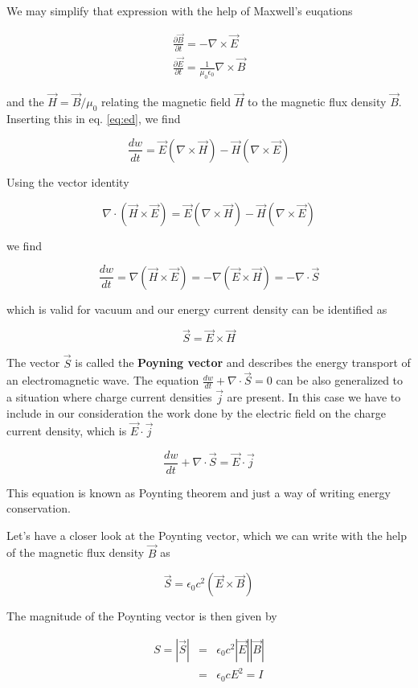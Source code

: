 \documentclass[
  a4paper,
]{book}
\begin{document}
We may simplify that expression with the help of Maxwell's euqations

\begin{eqnarray}
\frac{\partial \vec{B}}{\partial t}=-\nabla \times \vec{E}\\
\frac{\partial \vec{E}}{\partial t}=\frac{1}{\mu_0\epsilon_0}\nabla \times \vec{B}
\end{eqnarray}

and the \(\vec{H}=\vec{B}/\mu_0\) relating the magnetic field
\(\vec{H}\) to the magnetic flux density \(\vec{B}\). Inserting this in
eq. \ref{eq:ed}, we find

\[
\frac{dw}{dt}=\vec{E}(\nabla\times \vec{H})-\vec{H}(\nabla \times \vec{E})
\]

Using the vector identity

\[
\nabla\cdot (\vec{H}\times \vec{E})=\vec{E}(\nabla\times \vec{H})-\vec{H}(\nabla \times \vec{E})
\]

we find

\[
\frac{dw}{dt}=\nabla(\vec{H}\times \vec{E}) =- \nabla(\vec{E}\times \vec{H})=-\nabla \cdot \vec{S}
\]

which is valid for vacuum and our energy current density can be
identified as

\[
\vec{S}=\vec{E}\times \vec{H}
\tag{Poynting Vector}
\]

The vector \(\vec{S}\) is called the \textbf{Poyning vector} and
describes the energy transport of an electromagnetic wave. The equation
\(\frac{dw}{dt}+\nabla \cdot \vec{S}=0\) can be also generalized to a
situation where charge current densities \(\vec{j}\) are present. In
this case we have to include in our consideration the work done by the
electric field on the charge current density, which is
\(\vec{E}\cdot\vec{j}\)

\[
\frac{dw}{dt}+\nabla \cdot \vec{S}=\vec{E}\cdot\vec{j}
\tag{Poynting theorem}
\]

This equation is known as Poynting theorem and just a way of writing
energy conservation.

Let's have a closer look at the Poynting vector, which we can write with
the help of the magnetic flux density \(\vec{B}\) as

\[
\vec{S}=\epsilon_0c^2(\vec{E}\times \vec{B})
\]

The magnitude of the Poynting vector is then given by

\begin{eqnarray}
S=|\vec{S}|&=&\epsilon_0c^2|\vec{E}||\vec{B}|\\
&=&\epsilon_0 c E^2=I
\end{eqnarray}
\end{document}
